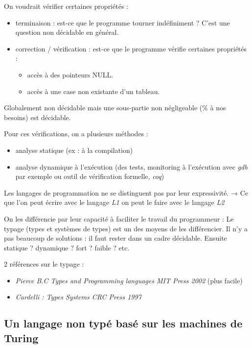 \documentclass[]{article}
\providecommand{\tightlist}{%
  \setlength{\itemsep}{0pt}\setlength{\parskip}{0pt}}
\begin{document}
On voudrait vérifier certaines propriétés :

\begin{itemize}
\tightlist
\item
  terminaison : est-ce que le programme tourner indéfiniment ? C'est une
  question non décidable en général.
\item
  correction / vérification : est-ce que le programme vérifie certaines
  propriétés :

  \begin{itemize}
  \tightlist
  \item
    accès à des pointeurs NULL.
  \item
    accès à une case non existante d'un tableau.
  \end{itemize}
\end{itemize}

Globalement non décidable mais une sous-partie non négligeable (\% à nos
besoins) est décidable.

Pour ces vérifications, on a plusieurs méthodes :

\begin{itemize}
\tightlist
\item
  analyse statique (ex : à la compilation)
\item
  analyse dynamique à l'exécution (des tests, monitoring à l'exécution
  avec \emph{gdb} par exemple ou outil de vérification formelle,
  \emph{coq})
\end{itemize}

Les langages de programmation ne se distinguent pas par leur
expressivité. → Ce que l'on peut écrire avec le langage \emph{L1} on
peut le faire avec le langage \emph{L2}

On les différencie par leur capacité à faciliter le travail du
programmeur : Le typage (types et systèmes de types) est un des moyens
de les différencier. Il n'y a pas beaucoup de solutions : il faut rester
dans un cadre décidable. Ensuite statique ? dynamique ? fort ? faible ?
etc.

2 références sur le typage :

\begin{itemize}
\tightlist
\item
  \emph{Pierce B.C Types and Programming languages MIT Press 2002} (plus
  facile)
\item
  \emph{Cardelli : Types Systems CRC Press 1997}
\end{itemize}

\subsection{Un langage non typé basé sur les machines de
Turing}\label{un-langage-non-typuxe9-basuxe9-sur-les-machines-de-turing}
\end{document}
